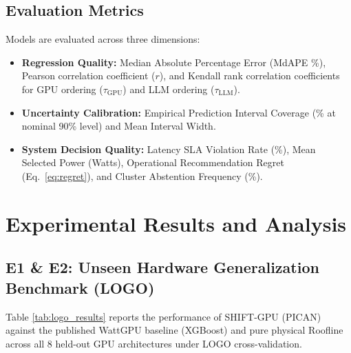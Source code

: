 \documentclass[3p,12pt]{elsarticle}
\begin{document}
\subsection{Evaluation Metrics}
Models are evaluated across three dimensions:
\begin{itemize}
    \item \textbf{Regression Quality:} Median Absolute Percentage Error (MdAPE \%), Pearson correlation coefficient ($r$), and Kendall rank correlation coefficients for GPU ordering ($\tau_{\text{GPU}}$) and LLM ordering ($\tau_{\text{LLM}}$).
    \item \textbf{Uncertainty Calibration:} Empirical Prediction Interval Coverage (\% at nominal 90\% level) and Mean Interval Width.
    \item \textbf{System Decision Quality:} Latency SLA Violation Rate (\%), Mean Selected Power (Watts), Operational Recommendation Regret (Eq.~\eqref{eq:regret}), and Cluster Abstention Frequency (\%).
\end{itemize}

\section{Experimental Results and Analysis}
\label{sec:results}

\subsection{E1 \& E2: Unseen Hardware Generalization Benchmark (LOGO)}
Table \ref{tab:logo_results} reports the performance of SHIFT-GPU (PICAN) against the published WattGPU baseline (XGBoost) and pure physical Roofline across all 8 held-out GPU architectures under LOGO cross-validation.
\end{document}

